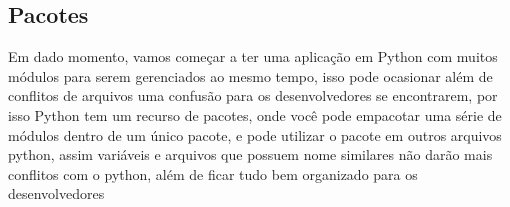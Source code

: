             \subsection{Pacotes}
            
            Em dado momento, vamos começar a ter uma aplicação em Python com muitos módulos para serem gerenciados ao mesmo tempo, isso pode ocasionar além de conflitos de arquivos uma confusão para os desenvolvedores se encontrarem, por isso Python tem um recurso de pacotes, onde você pode empacotar uma série de módulos dentro de um único pacote, e pode utilizar o pacote em outros arquivos python, assim variáveis e arquivos que possuem nome similares não darão mais conflitos com o python, além de ficar tudo bem organizado para os desenvolvedores













